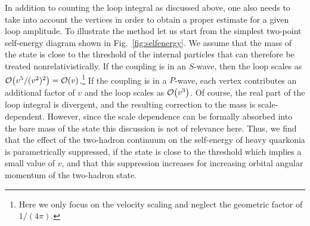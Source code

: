 In addition to counting the loop integral as discussed above, one also needs to
take into account the vertices in order to obtain a proper estimate for a given
loop amplitude.
To illustrate the method let us start from the simplest two-point self-energy
diagram shown in Fig.~\ref{fig:selfenergy}. We assume that the mass of the state
is close to the threshold of the internal particles that can therefore be
treated nonrelativistically. If the coupling is in an $S$-wave, then the loop
scales as $\mathcal{O}\!\left(v^5/(v^2)^2\right)\!\,=\mathcal{O}\!\left(v\right)\!\,$.\footnote{Here we only focus on the
velocity scaling and neglect the geometric factor of $1/(4\pi)$.} If the
coupling is in a $P$-wave, each vertex contributes an additional factor of $v$
and the loop scales as $\mathcal{O}\!\left(v^3\right)\!\,$. Of course, the real part of the loop
integral is divergent, and the resulting correction to the mass is
scale-dependent.
However, since the scale dependence can be formally absorbed into the bare mass
of the state this discussion is not of relevance here. Thus, we find that the
effect of the two-hadron continuum on the self-energy of heavy quarkonia is
parametrically suppressed, if the state is close to the threshold which implies
a small value of $v$, and that this suppression increases for increasing orbital
angular momentum of the two-hadron state.

